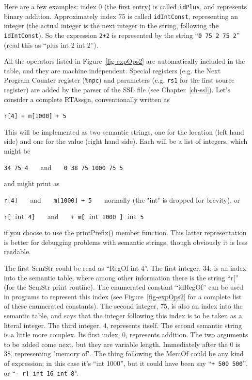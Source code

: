 Here are a few examples: index 0 (the first entry) is called \texttt{idPlus},
and represents binary addition. Approximately index 75 is called
\texttt{idIntConst}, representing an integer (the actual integer is the next
integer in the string, following the {\tt idIntConst}).  So the expression
\texttt{2+2} is represented by the string ``{\tt 0 75 2 75 2}'' (read this
as ``plus int 2 int 2''). 

All the operators listed in Figure~\ref{fig-expOps2} are automatically
included in the table, and they are
machine independent. Special registers (e.g. the Next Program Counter register
({\tt \%npc}) and parameters (e.g. {\tt rs1} for the first source
register) are added
by the parser of the SSL file (see Chapter~\ref{ch-ssl}).
Let's consider a complete RTAssgn, conventionally written as

{\tt r[4] = m[1000] + 5}

This will be implemented as two semantic strings, one for the
location (left hand side) and one for the value (right hand side).
Each will be a list of integers, which might be

{\tt 34 75 4} ~~~and~~~ {\tt 0 38 75 1000 75 5}

and might print as

{\tt r[4]} ~~~and~~~   {\tt m[1000] + 5}  ~~~normally (the "int" is dropped
for brevity), or

{\tt r[ int 4]}  ~~~and~~~  {\tt + m[ int 1000 ] int 5}

if you choose to use the printPrefix() member function. This latter
representation is better for debugging problems with semantic strings,
though obviously it is less readable.

The first SemStr could be read as ``RegOf int 4''. The first integer, 34,
is an index into the semantic table, where among other information
there is the string ``r['' (for the SemStr print routine).
The enumerated constant ``idRegOf'' can be used in programs to
represent this index (see Figure~\ref{fig-expOps2} for a complete list
of these enumerated constants). The second integer,
75, is also an index into the semantic table, and says that the integer
following this index is to be taken as a literal integer. The third
integer, 4, represents itself. The second semantic string is a little
more complex. Its first index, 0, represents addition. The two arguments
to be added come next, but they are variable length. Immediately after
the 0 is 38, representing "memory of". The thing following the MemOf
could be any kind of expression; in this case it's ``int 1000'', but
it could have been say ``{\tt+ 500 500}'', or ``{\tt - r[ int 16 int 8}''.

